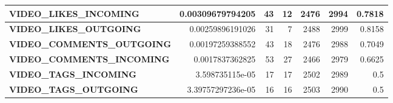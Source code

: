 \begin{table}
\begin{tabular}{| >{\small}l | >{\small}r | >{\small}r | >{\small}r | >{\small}r | >{\small}r | >{\small}r |}
	\hline
	\textbf{VIDEO\_LIKES\_INCOMING}& 0.00309679794205 & 43 & 12 & 2476 & 2994 & 0.7818\\
	\hline
	\textbf{VIDEO\_LIKES\_OUTGOING}& 0.00259896191026 & 31 & 7 & 2488 & 2999 & 0.8158\\
	\hline
	\textbf{VIDEO\_COMMENTS\_OUTGOING}& 0.00197259388552 & 43 & 18 & 2476 & 2988 & 0.7049\\
	\hline
	\textbf{VIDEO\_COMMENTS\_INCOMING}& 0.0017837362825 & 53 & 27 & 2466 & 2979 & 0.6625\\
	\hline
	\textbf{VIDEO\_TAGS\_INCOMING}& 3.598735115e-05 & 17 & 17 & 2502 & 2989 & 0.5 \\
	\hline
	\textbf{VIDEO\_TAGS\_OUTGOING}& 3.39757297236e-05 & 16 & 16 & 2503 & 2990 & 0.5\\
	\hline
	\end{tabular}
\end{table}



\cleardoublepage

